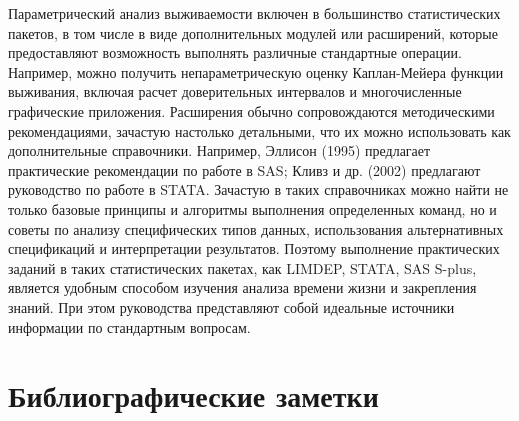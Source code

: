 \noindent
Параметрический анализ выживаемости включен в большинство статистических пакетов, в том числе в виде дополнительных модулей или расширений, которые предоставляют возможность выполнять различные стандартные операции. Например, можно получить непараметрическую оценку Каплан-Мейера функции выживания, включая расчет доверительных интервалов и многочисленные графические приложения. Расширения обычно сопровождаются методическими рекомендациями, зачастую настолько детальными, что их можно использовать как дополнительные справочники. Например, Эллисон (1995) предлагает практические рекомендации по работе в SAS; Кливз и др. (2002) предлагают руководство по работе в STATA. Зачастую в таких справочниках можно найти не только базовые принципы и алгоритмы выполнения определенных команд, но и советы по анализу специфических типов данных, использования альтернативных спецификаций и интерпретации результатов. Поэтому выполнение практических заданий в таких статистических пакетах, как LIMDEP, STATA, SAS S-plus, является удобным способом изучения анализа времени жизни и закрепления знаний. При этом руководства представляют собой идеальные источники информации по стандартным вопросам.




\section{Библиографические заметки}\label{sec:17.13}

